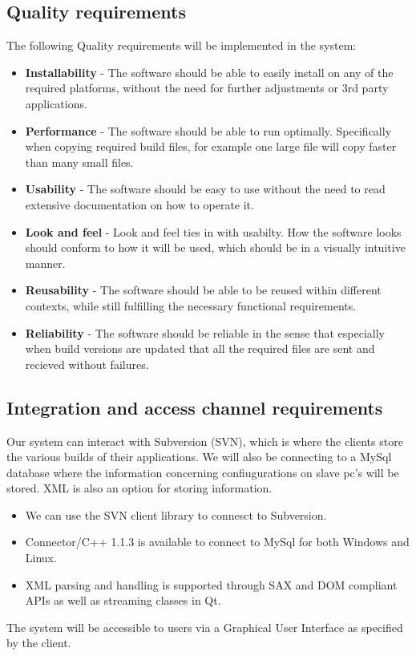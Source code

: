 \documentclass[a4paper,12pt,final]{article}
\begin{document}
\subsection{Quality requirements}
The following Quality requirements will be implemented in the system:
\begin{itemize}
\item \textbf{Installability} - The software should be able to easily install on any of the required platforms, without the need for further adjustments or 3rd party applications.
\item \textbf{Performance} - The software should be able to run optimally. Specifically when copying required build files, for example one large file will copy faster than many small files.
\item \textbf{Usability} - The software should be easy to use without the need to read extensive documentation on how to operate it.
\item \textbf{Look and feel} - Look and feel ties in with usabilty.  How the software looks should conform to how it will be used, which should be in a visually intuitive manner.
\item \textbf{Reusability} - The software should be able to be reused within different contexts, while still fulfilling the necessary functional requirements.
\item \textbf{Reliability} - The software should be reliable in the sense that especially when build versions are updated that all the required files are sent and recieved without failures.
\end{itemize}
\subsection{Integration and access channel requirements}
Our system can interact with Subversion (SVN), which is where the clients store the various builds of their applications. We will also be connecting to a MySql database where the information concerning confiugurations on slave pc's will be stored. XML is also an option for storing information.
\begin{itemize}
\item We can use the SVN client library to connesct to Subversion.
\item Connector/C++ 1.1.3 is available to connect to MySql for both Windows and Linux.
\item XML parsing and handling is supported through SAX and DOM compliant APIs as well as streaming classes in Qt.
\end{itemize}
The system will be accessible to users via a Graphical User Interface as specified by the client.
\end{document}
